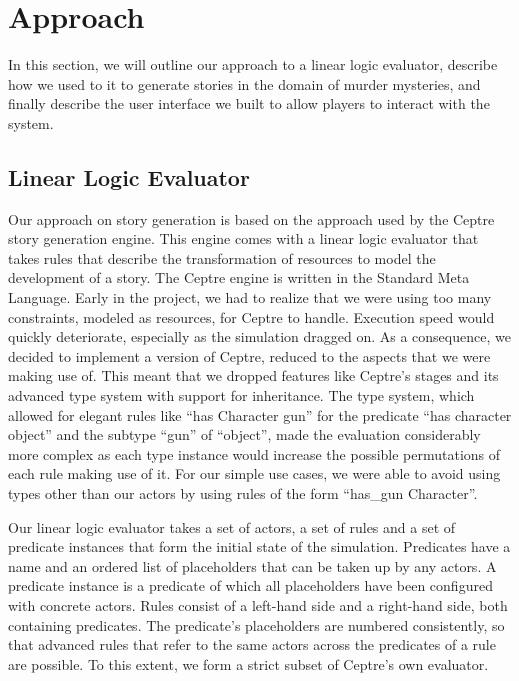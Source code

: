 \section{Approach} \label{approach}

In this section, we will outline our approach to a linear logic evaluator, describe how we used to it to generate stories in the domain of murder mysteries, and finally describe the user interface we built to allow players to interact with the system.

\subsection{Linear Logic Evaluator}\label{own_linear_logic_evaluator}

Our approach on story generation is based on the approach used by the Ceptre story generation engine.
This engine comes with a linear logic evaluator that takes rules that describe the transformation of resources to model the development of a story.
The Ceptre engine is written in the Standard Meta Language.
Early in the project, we had to realize that we were using too many constraints, modeled as resources, for Ceptre to handle.
Execution speed would quickly deteriorate, especially as the simulation dragged on.
As a consequence, we decided to implement a version of Ceptre, reduced to the aspects that we were making use of.
This meant that we dropped features like Ceptre's stages and its advanced type system with support for inheritance.
The type system, which allowed for elegant rules like \enquote{has Character gun} for the predicate \enquote{has character object} and the subtype \enquote{gun} of \enquote{object}, made the evaluation considerably more complex as each type instance would increase the possible permutations of each rule making use of it.
For our simple use cases, we were able to avoid using types other than our actors by using rules of the form \enquote{has\_gun Character}.

Our linear logic evaluator takes a set of actors, a set of rules and a set of predicate instances that form the initial state of the simulation.
Predicates have a name and an ordered list of placeholders that can be taken up by any actors.
A predicate instance is a predicate of which all placeholders have been configured with concrete actors.
Rules consist of a left-hand side and a right-hand side, both containing predicates.
The predicate's placeholders are numbered consistently, so that advanced rules that refer to the same actors across the predicates of a rule are possible.
To this extent, we form a strict subset of Ceptre's own evaluator. 

